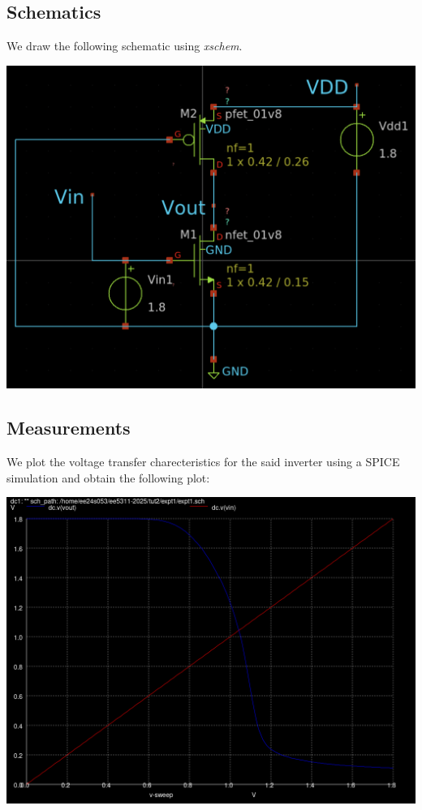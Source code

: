 \documentclass[10pt,letter]{article}
\begin{document}
\subsection{Schematics}
We draw the following schematic using \emph{xschem}.
\newline
\begin{center}
\includegraphics[scale=0.4]{tut2/reports/media/expt1.sch.png}
\end{center}


\subsection{Measurements}

We plot the voltage transfer charecteristics for the said inverter using a SPICE simulation and obtain the following plot:

\begin{center}
\includegraphics[scale=0.3]{tut2/reports/media/expt1_vtc.png}
\end{center}
\end{document}
